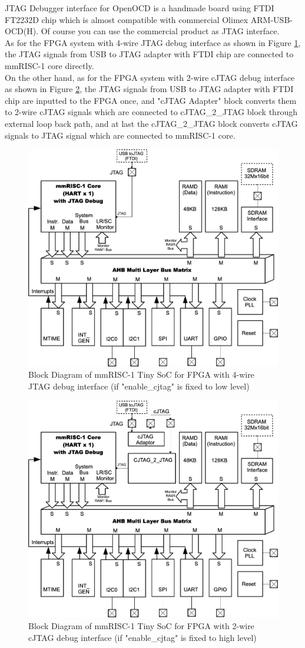 JTAG Debugger interface for OpenOCD is a handmade board using FTDI FT2232D chip which is almost compatible with commercial Olimex ARM-USB-OCD(H). Of course you can use the commercial product as JTAG interface.\\
As for the FPGA system with 4-wire JTAG debug interface as shown in Figure \ref{fig:BLOCKDIAGRAMJTAG}, the JTAG signals from USB to JTAG adapter with FTDI chip are connected to mmRISC-1 core directly.\\

On the other hand, as for the FPGA system with 2-wire cJTAG debug interface as shown in Figure \ref{fig:BLOCKDIAGRAMCJTAG}, the JTAG signals from USB to JTAG adapter with FTDI chip are inputted to the FPGA once, and "cJTAG Adapter" block converts them to 2-wire cJTAG signals which are connected to cJTAG\_2\_JTAG block through external loop back path, and at last the cJTAG\_2\_JTAG block converts cJTAG signals to JTAG signal which are connected to mmRISC-1 core.

\begin{figure}[H]
    \includegraphics[width=0.8\columnwidth]{./Figure/BlockDiagramJTAG.png}
    \caption{Block Diagram of mmRISC-1 Tiny SoC for FPGA with 4-wire JTAG debug interface (if "enable\_cjtag" is fixed to low level)}
    \label{fig:BLOCKDIAGRAMJTAG}
\end{figure}

\begin{figure}[H]
    \includegraphics[width=0.8\columnwidth]{./Figure/BlockDiagramCJTAG.png}
    \caption{Block Diagram of mmRISC-1 Tiny SoC for FPGA with 2-wire cJTAG debug interface (if "enable\_cjtag" is fixed to high level)}
    \label{fig:BLOCKDIAGRAMCJTAG}
\end{figure}
